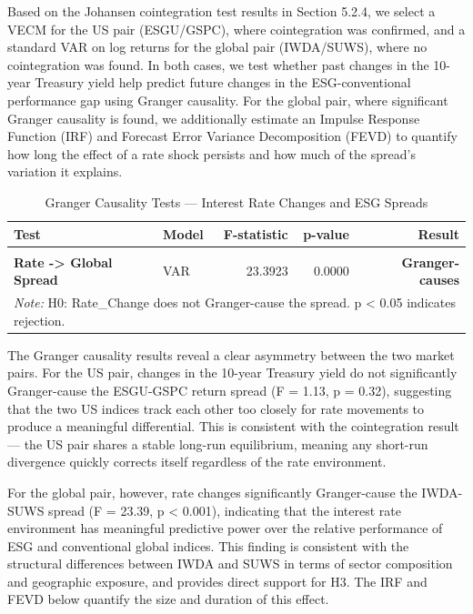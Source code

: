 \documentclass[
]{article}
\begin{document}
Based on the Johansen cointegration test results in Section 5.2.4, we
select a VECM for the US pair (ESGU/GSPC), where cointegration was
confirmed, and a standard VAR on log returns for the global pair
(IWDA/SUWS), where no cointegration was found. In both cases, we test
whether past changes in the 10-year Treasury yield help predict future
changes in the ESG-conventional performance gap using Granger causality.
For the global pair, where significant Granger causality is found, we
additionally estimate an Impulse Response Function (IRF) and Forecast
Error Variance Decomposition (FEVD) to quantify how long the effect of a
rate shock persists and how much of the spread's variation it explains.

\begingroup\fontsize{10}{12}\selectfont

\begin{longtable}[t]{>{}llrr>{}r}
\caption{\label{tab:var-model}Granger Causality Tests — Interest Rate Changes and ESG Spreads}\\
\toprule
Test & Model & F-statistic & p-value & Result\\
\midrule
\textbf{\cellcolor{gray!10}{Rate -> US Spread}} & \cellcolor{gray!10}{VECM} & \cellcolor{gray!10}{1.1280} & \cellcolor{gray!10}{0.3238} & \textbf{\cellcolor{gray!10}{Does not Granger-cause}}\\
\textbf{Rate -> Global Spread} & VAR & 23.3923 & 0.0000 & \textbf{Granger-causes}\\
\bottomrule
\multicolumn{5}{l}{\rule{0pt}{1em}\textit{Note: } H0: Rate\_Change does not Granger-cause the spread. p < 0.05 indicates rejection.}\\
\end{longtable}
\endgroup{}

The Granger causality results reveal a clear asymmetry between the two
market pairs. For the US pair, changes in the 10-year Treasury yield do
not significantly Granger-cause the ESGU-GSPC return spread (F = 1.13, p
= 0.32), suggesting that the two US indices track each other too closely
for rate movements to produce a meaningful differential. This is
consistent with the cointegration result --- the US pair shares a stable
long-run equilibrium, meaning any short-run divergence quickly corrects
itself regardless of the rate environment.

For the global pair, however, rate changes significantly Granger-cause
the IWDA-SUWS spread (F = 23.39, p \textless{} 0.001), indicating that
the interest rate environment has meaningful predictive power over the
relative performance of ESG and conventional global indices. This
finding is consistent with the structural differences between IWDA and
SUWS in terms of sector composition and geographic exposure, and
provides direct support for H3. The IRF and FEVD below quantify the size
and duration of this effect.
\end{document}
